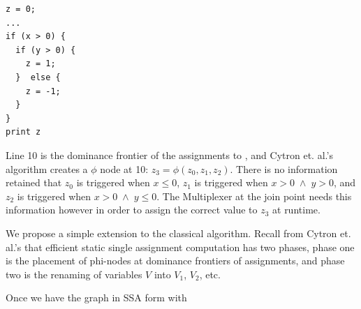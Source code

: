 \documentclass[sigconf, screen, natbib=false, dvipsnames, table]{acmart}
\theoremstyle{definition}
\begin{document}
\begin{verbatim}
z = 0;
...
if (x > 0) {
  if (y > 0) {
    z = 1;
  }  else {
    z = -1;
  }
}
print z
\end{verbatim}
Line 10 is the dominance frontier of the assignments to \z, and Cytron et. al.'s algorithm
creates a $\phi$ node at 10: $z_3 = \phi(z_0, z_1, z_2)$. There is no information retained
that $z_0$ is triggered when $x \le 0$, $z_1$ is triggered when $x > 0 \; \wedge \; y > 0$, 
and $z_2$ is triggered when $x > 0 \; \wedge \; y \le 0$. The Multiplexer at the join point
needs this information however in order to assign the correct value to $z_3$ at runtime.

We propose a simple extension to the classical algorithm. Recall from Cytron et. al.'s 
that efficient static single assignment computation has two phases, phase one is the 
placement of phi-nodes at dominance frontiers of assignments, and phase two is the 
renaming of variables $V$ into $V_1$, $V_2$, etc.



Once we have the graph in SSA form with 
\end{document}
